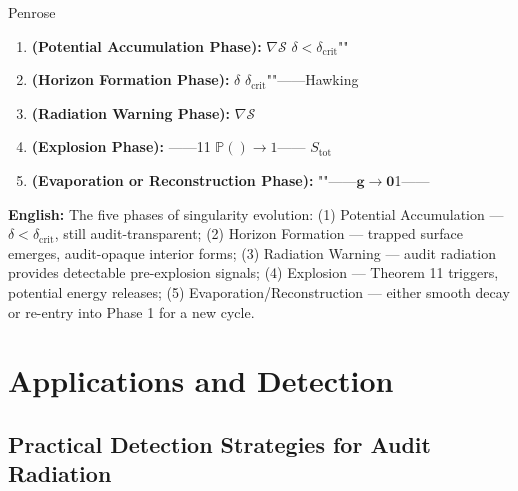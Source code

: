 \documentclass[12pt,a4paper]{article}
\theoremstyle{remark}
\newcommand{\Pbb}{\mathbb{P}}
\newcommand{\g}{\mathbf{g}}
\begin{document}
\noindent
\textbf{} Penrose

\begin{enumerate}[label=\textbf{ \arabic*}, leftmargin=*]
    \item \textbf{ (Potential Accumulation Phase):} $\nabla\mathcal{S}$  $\delta < \delta_{\mathrm{crit}}$""
    
    \item \textbf{ (Horizon Formation Phase):}  $\delta$  $\delta_{\mathrm{crit}}$""——Hawking
    
    \item \textbf{ (Radiation Warning Phase):}  $\nabla\mathcal{S}$ 
    
    \item \textbf{ (Explosion Phase):} ——11 $\Pbb(\text{}) \to 1$—— $S_{\mathrm{tot}}$
    
    \item \textbf{ (Evaporation or Reconstruction Phase):} ""——$\g \to \mathbf{0}$1——
\end{enumerate}

\vspace{4pt}
\noindent
\textbf{English:} The five phases of singularity evolution: (1) Potential Accumulation — $\delta < \delta_{\mathrm{crit}}$, still audit-transparent; (2) Horizon Formation — trapped surface emerges, audit-opaque interior forms; (3) Radiation Warning — audit radiation provides detectable pre-explosion signals; (4) Explosion — Theorem 11 triggers, potential energy releases; (5) Evaporation/Reconstruction — either smooth decay or re-entry into Phase 1 for a new cycle.

\section{}
\section{Applications and Detection}

\subsection{}
\subsection{Practical Detection Strategies for Audit Radiation}
\end{document}
